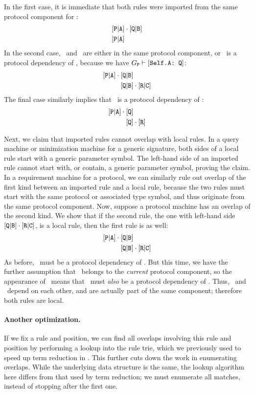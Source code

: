 \documentclass[../generics]{subfiles}
\begin{document}
In the first case, it is immediate that both rules were imported from the same protocol component for \tP:
\begin{align*}
&[\texttt{P}|\texttt{A}]\cdot[\texttt{Q}|\texttt{B}]\\
&[\texttt{P}|\texttt{A}]
\end{align*}
In the second case, \tP\ and \tQ\ are either in the same protocol component, or \tQ\ is a protocol dependency of \tP, because we have $G_{\texttt{P}}\vdash[\texttt{Self.A:~Q}]$:
\begin{align*}
[\texttt{P}|\texttt{A}]\cdot{}&[\texttt{Q}|\texttt{B}]\\
&[\texttt{Q}|\texttt{B}]\cdot[\texttt{R}|\texttt{C}]
\end{align*}
The final case similarly implies that \tQ\ is a protocol dependency of \tP:
\begin{align*}
[\texttt{P}|\texttt{A}]\cdot{}&[\texttt{Q}]\\
&[\texttt{Q}]\cdot[\texttt{R}]
\end{align*}

Next, we claim that imported rules cannot overlap with local rules. In a query machine or minimization machine for a generic signature, both sides of a local rule start with a generic parameter symbol. The left-hand side of an imported rule cannot start with, or contain, a generic parameter symbol, proving the claim. In a requirement machine for a protocol, we can similarly rule out overlap of the first kind between an imported rule and a local rule, because the two rules must start with the same protocol or associated type symbol, and thus originate from the same protocol component. Now, suppose a protocol machine has an overlap of the second kind. We show that if the second rule, the one with left-hand side $[\texttt{Q}|\texttt{B}]\cdot[\texttt{R}|\texttt{C}]$, is a local rule, then the first rule is as well:
\begin{align*}
[\texttt{P}|\texttt{A}]\cdot{}&[\texttt{Q}|\texttt{B}]\\
&[\texttt{Q}|\texttt{B}]\cdot[\texttt{R}|\texttt{C}]
\end{align*}
As before, \tQ\ must be a protocol dependency of \tP. But this time, we have the further assumption that \tQ\ belongs to the \emph{current} protocol component, so the appearance of \tP\ means that \tP\ must \emph{also} be a protocol dependency of \tQ. Thus, \tP\ and \tQ\ depend on each other, and are actually part of the same component; therefore both rules are local.

\paragraph{Another optimization.} If we fix a rule and position, we can find all overlaps involving this rule and position by performing a lookup into the rule trie, which we previously used to speed up term reduction in . This further cuts down the work in enumerating overlaps. While the underlying data structure is the same, the lookup algorithm here differs from that used by term reduction; we must enumerate all matches, instead of stopping after the first one.
\end{document}
